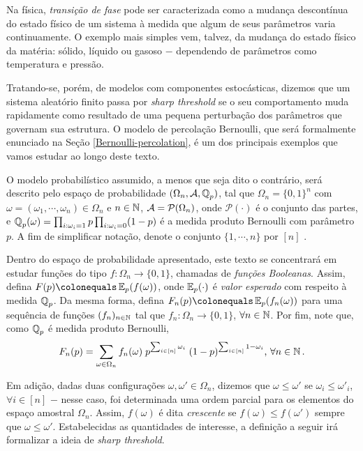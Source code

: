 \par Na física, \textit{transição de fase} pode ser caracterizada como a mudança descontínua do estado físico de um sistema à medida que algum de seus parâmetros varia continuamente. O exemplo mais simples vem, talvez, da mudança do estado físico da matéria: sólido, líquido ou gasoso $-$ dependendo de parâmetros como temperatura e pressão.

\par Tratando-se, porém, de modelos com componentes estocásticas, dizemos que um sistema aleatório finito passa por \textit{sharp threshold} se o seu comportamento muda rapidamente como resultado de uma pequena perturbação dos parâmetros que governam sua estrutura. O modelo de percolação Bernoulli, que será formalmente enunciado na Seção \ref{Bernoulli-percolation}, é um dos principais exemplos que vamos estudar ao longo deste texto.

\par O modelo probabilístico assumido, a menos que seja dito o contrário, será descrito pelo espaço de probabilidade $(\Omega_n, \operatorname{\mathcal{A}}, \operatorname{\mathbb{Q}}_p)$, tal que $\Omega_n = \{0,1\}^n$ com $\omega = (\omega_1, \cdots, \omega_n) \in \Omega_n$ e $n \in \operatorname{\mathbb{N}}$, $\operatorname{\mathcal{A}} = \mathcal{P}(\Omega_n)$, onde $\mathcal{P}(\cdot)$ é o conjunto das partes, e $\operatorname{\mathbb{Q}}_p(\omega) = \prod_{i:\omega_i = 1} p \prod_{i:\omega_i = 0} (1 - p)$ é a medida produto Bernoulli com parâmetro $p$. A fim de simplificar notação, denote o conjunto $\{1, \cdots, n\}$ por $[n]$ .

\par Dentro do espaço de probabilidade apresentado, este texto se concentrará em estudar funções do tipo $f: \Omega_n \longrightarrow \{0,1\}$, chamadas de \textit{funções Booleanas}. Assim, defina $F(p) \colonequals \EX_p(f(\omega))$, onde $\operatorname{\mathbb{E}}_p(\cdot)$ é \textit{valor esperado} com respeito à medida $\operatorname{\mathbb{Q}}_p$. Da mesma forma, defina $F_n(p) \colonequals \EX_p(f_n(\omega))$ para uma sequência de funções $(f_n)_{n \in \operatorname{\mathbb{N}}}$ tal que $f_n: \Omega_n \longrightarrow \{0,1\}$, $\forall n \in \operatorname{\mathbb{N}}$. Por fim, note que, como $\operatorname{\mathbb{Q}}_p$ é medida produto Bernoulli,
\begin{align}\label{eq-esperanca}
	F_n(p) = \sum_{\omega \in \Omega_n} f_n(\omega) \; p^{\sum_{i \in [n]}\omega_i} \; (1 - p)^{\sum_{i \in [n]}1 - \omega_i}\text{, }\forall n \in \operatorname{\mathbb{N}}.
\end{align} 
\par Em adição, dadas duas configurações $\omega, \omega' \in \Omega_n$, dizemos que $\omega \leq \omega'$ se $\omega_i \leq \omega'_i$, $\forall i \in [n]$ $-$ nesse caso, foi determinada uma ordem parcial para os elementos do espaço amostral $\Omega_n$. Assim, $f(\omega)$ é dita \textit{crescente} se $f(\omega) \leq f(\omega')$ sempre que $\omega \leq \omega'$. Estabelecidas as quantidades de interesse, a definição a seguir irá formalizar a ideia de \textit{sharp threshold}.

